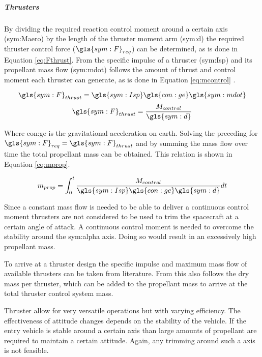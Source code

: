 \subparagraph{Thrusters}
\label{subpar:thrusters}

By dividing the required reaction control moment around a certain axis (\gls{sym:Maero}) by the length of the thruster moment arm (\gls{sym:d}) the required thruster control force ($\gls{sym:F}_{req}$) can be determined, as is done in Equation \ref{eq:Fthrust}. From the specific impulse of a thruster (\gls{sym:Isp}) and its propellant mass flow (\gls{sym:mdot}) follows the amount of thrust and control moment each thruster can generate, as is done in Equation \ref{eq:mcontrol} \cite{Allen2012}.
\begin{multicols}{2}
\begin{equation}
\gls{sym:F}_{thrust}=\gls{sym:Isp}\gls{con:ge}\gls{sym:mdot}
\label{eq:Fthrust}
\end{equation}
\begin{equation} \label{eq:mcontrol}
\gls{sym:F}_{thrust}=\frac{M_{control}}{\gls{sym:d}}
\end{equation}
\end{multicols}
Where \gls{con:ge} is the gravitational acceleration on earth. Solving the preceding for $\gls{sym:F}_{req}=\gls{sym:F}_{thrust}$ and by summing the mass flow over time the total propellant mass can be obtained. This relation is shown in Equation \ref{eq:mprop}.

\begin{equation}
m_{prop} = \int_{0}^{t} \frac{M_{control}}{\gls{sym:Isp}\gls{con:ge}\gls{sym:d}} dt
\label{eq:mprop}
\end{equation}

Since a constant mass flow is needed to be able to deliver a continuous control moment thrusters are not considered to be used to trim the spacecraft at a certain angle of attack. A continuous control moment is needed to overcome the stability around the \gls{sym:alpha} axis. Doing so would result in an excessively high propellant mass.

To arrive at a thruster design the specific impulse and maximum mass flow of available thrusters can be taken from literature. From this also follows the dry mass per thruster, which can be added to the propellant mass to arrive at the total thruster control system mass.

Thruster allow for very versatile operations but with varying efficiency. The effectiveness of attitude changes depends on the stability of the vehicle. If the entry vehicle is stable around a certain axis than large amounts of propellant are required to maintain a certain attitude. Again, any trimming around such a axis is not feasible.

